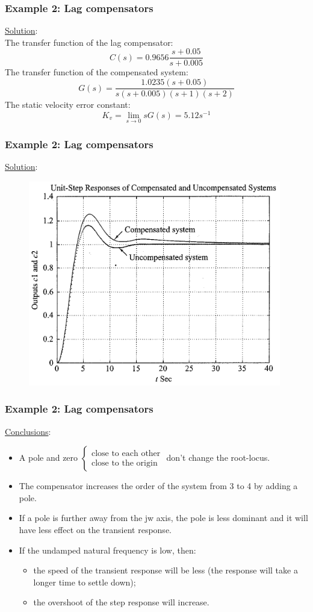 \begin{frame}
	\frametitle{Example 2: Lag compensators}
	\underline{Solution}:\\
	The transfer function of the lag compensator: 
	$$C(s)=0.9656\frac{s+0.05}{s+0.005}$$
	The transfer function of the compensated system:
	$$G(s)=\frac{1.0235(s+0.05)}{s(s+0.005)(s+1)(s+2)}$$
	The static velocity error constant:
	$$K_v=\lim_{s\to 0}sG(s)=5.12s^{-1}$$
\end{frame}

\begin{frame}
	\frametitle{Example 2: Lag compensators}
	\underline{Solution}:
	\begin{figure}
		\centering
		\includegraphics[width=0.65\linewidth]{Ex2_response}
	\end{figure}
\end{frame}

\begin{frame}
	\frametitle{Example 2: Lag compensators}
	\underline{Conclusions}:
	\begin{itemize}
		\item A pole and zero 
		$\begin{cases} \text{close to each other} \\ \text{close to the origin} \end{cases}$ don't change the root-locus.
		\item The compensator increases the order of the system from 3 to 4 by adding a pole. 
		\item If a pole is further away from the jw axis, the pole is less dominant and it will have less effect on the transient response.
		\item If the undamped natural frequency is low, then:
		\begin{itemize}
			\item the speed of the transient response will be less (the response will take a longer time to settle down);
			\item the overshoot of the step response will increase.
		\end{itemize}
	\end{itemize}
\end{frame}

